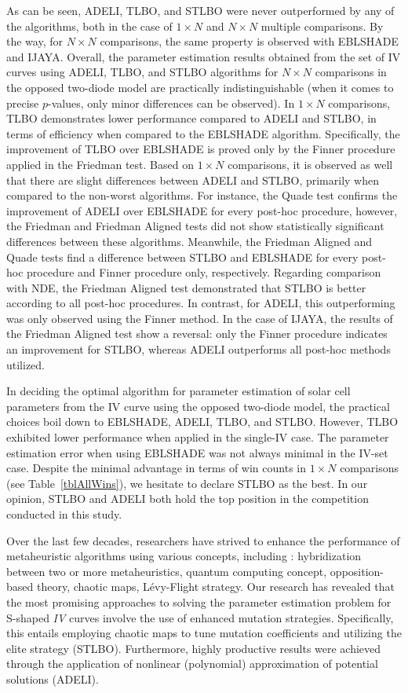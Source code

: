 \documentclass[a4paper,fleqn]{cas-sc}
\begin{document}
As can be seen,
ADELI, TLBO, and STLBO were never outperformed by any of the algorithms,
both in the case of $1\times N$ and $N\times N$ multiple comparisons.
By the way, for $N\times N$ comparisons, the same property is observed with EBLSHADE and IJAYA.
Overall, the parameter estimation results obtained from the set of IV curves
using ADELI, TLBO, and STLBO algorithms for $N\times N$ comparisons in the opposed two-diode model are practically indistinguishable
(when it comes to precise $p$-values, only minor differences can be observed).
In $1\times N$ comparisons, TLBO demonstrates lower performance compared to ADELI and STLBO,
in terms of efficiency when compared to the EBLSHADE algorithm.
Specifically, the improvement of TLBO over EBLSHADE is proved only by the Finner procedure applied in the Friedman test.
Based on $1\times N$ comparisons, it is observed as well that there are slight differences between ADELI and STLBO,
primarily when compared to the non-worst algorithms.
For instance, the Quade test confirms the improvement of ADELI over EBLSHADE for every post-hoc procedure,
however, the Friedman and Friedman Aligned tests did not show statistically significant differences between these algorithms.
Meanwhile, the Friedman Aligned and Quade tests find a difference between STLBO and EBLSHADE
for every post-hoc procedure and Finner procedure only, respectively.
Regarding comparison with NDE, the Friedman Aligned test demonstrated that STLBO is better according to all post-hoc procedures.
In contrast, for ADELI, this outperforming was only observed using the Finner method.
In the case of IJAYA,
the results of the Friedman Aligned test show a reversal:
only the Finner procedure indicates an improvement for STLBO,
whereas ADELI outperforms all post-hoc methods utilized.

In deciding the optimal algorithm for parameter estimation of solar cell parameters
from the IV curve using the opposed two-diode model,
the practical choices boil down to EBLSHADE, ADELI, TLBO, and STLBO.
However, TLBO exhibited lower performance when applied in the single-IV case.
The parameter estimation error when using EBLSHADE was not always minimal in the IV-set case.
Despite the minimal advantage in terms of win counts in $1\times N$ comparisons
(see Table~\ref{tblAllWins}),
we hesitate to declare STLBO as the best.
In our opinion, STLBO and ADELI both hold the top position in the competition conducted in this study.



Over the last few decades, researchers have strived to enhance the performance of metaheuristic algorithms using various concepts, including \cite{Kepler}:
hybridization between two or more metaheuristics, quantum computing concept, opposition-based theory, chaotic maps,  L\'{e}vy-Flight strategy.
Our research has revealed that the most promising approaches to solving
the parameter estimation problem for S-shaped \emph{IV} curves involve the use of enhanced mutation strategies.
Specifically, this entails employing chaotic maps to tune mutation coefficients and utilizing the elite strategy (STLBO).
Furthermore, highly productive results were achieved through the application of nonlinear (polynomial) approximation of potential solutions (ADELI).
\end{document}
